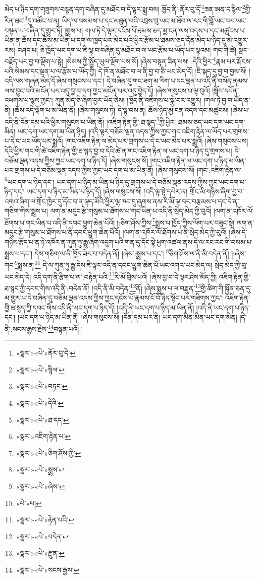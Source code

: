 མེད་པ་ཉིད་དག་གཟུགས་བརྙན་དག་བཞིན་དུ་མཐོང་བ་དེ་ལྟར་སྨྲ་བས། ཁྱོད་ནི་:ནོར་བུ་དོ་\footnote{«སྣར་»«པེ་»ནོར་བུ་དེ་}ཟན་ཨན་ད་རྙིལ་\footnote{«སྣར་»«པེ་»སྙིལ་}གྱི་རིན་ཐང་\footnote{«སྣར་»«པེ་»བཏང་}དུ་འཚོང་བ་ན། ཡིད་ལ་བསམས་པ་དང་མཐུན་པའི་འབྲས་བུ་ཡང་མ་ཐོབ་ལ་རང་གི་བློ་ཡང་བར་ཡང་བསྟན་པ་བཞིན་དུ་གྱུར་ཏོ། །སྨྲས་པ། གལ་ཏེ་དེ་ལྟར་དངོས་པོ་ཐམས་ཅད་མྱ་ངན་ལས་འདས་པ་དང་མཚུངས་པ་ཡིན་ན་ཆོས་དང་ཆོས་མ་ཡིན་པ་དག་ལ་ཁྱད་པར་མེད་པའི་ཕྱིར་རྩོམ་པ་ཐམས་ཅད་དོན་མེད་པ་ཉིད་དུ་མི་འགྱུར་རམ། བཤད་པ། ཅི་ཁྱོད་ཡང་དག་པ་ཇི་ལྟ་བ་བཞིན་དུ་མཐོང་བ་ལ་ཡང་རྩོམ་པ་ཡོད་པར་ལྟའམ། གང་གི་ཚེ། སྔར་བརྗོད་པར་བྱ་བ་ལྡོག་པ་སྟེ། །སེམས་ཀྱི་སྤྱོད་ཡུལ་ལྡོག་པས་སོ། །ཞེས་བསྟན་ཟིན་པས། :དེའི་ཕྱིར་\footnote{«སྣར་»«པེ་»དེའི་}རྣམ་པར་རྨོངས་པའི་སེམས་དང་ལྡན་པ་ལ་རྩོམ་པ་ཡོད་ཀྱི། དེ་ཁོ་ན་མཐོང་བ་ལ་ནི་བྱ་བ་ཅི་ཡང་མེད་དོ། །ཇི་སྐད་དུ་བྱ་བ་བྱས་སོ། །འདི་ལས་གཞན་མེད་དོ་ཞེས་གསུངས་པ་དང་། དེ་བཞིན་དུ་གང་ཟག་མ་རིག་པ་དང་ལྡན་པ་འདི་ནི་བསོད་ནམས་ལས་བྱུང་བའི་མངོན་པར་འདུ་བྱ་བ་དག་ཀྱང་མངོན་པར་འདུ་བྱེད་དོ། །ཞེས་གསུངས་པ་ལྟ་བུའོ། །སློབ་དཔོན་འཕགས་པ་ལྷས་ཀྱང་། ཀུན་མེད་ཅི་ཞིག་བྱར་ཡོད་ཅེས། །ཁྱོད་ནི་འཇིགས་པ་སྐྱེ་བར་འགྱུར། །གལ་ཏེ་བྱ་བ་ཡོད་ན་ནི། །ཆོས་འདི་ལྡོག་པ་མ་ཡིན་ནོ། །ཞེས་གསུངས་ཏེ། དེ་ལྟ་བས་ན། ཆོས་ཉིད་མྱ་ངན་འདས་དང་མཚུངས། །ཞེས་པ་འདི་ནི་དོན་དམ་པའི་ཕྱིར་གསུངས་པ་ཡིན་ནོ། །འཇིག་རྟེན་གྱི་:ཐ་སྙད་\footnote{«སྣར་»«པེ་»ཐ་དད་}ཀྱི་ཕྱིར། ཐམས་ཅད་ཡང་དག་ཡང་དག་མིན། ཡང་དག་ཡང་དག་མ་ཡིན་ཉིད། །འདི་ལྟར་བཅོམ་ལྡན་འདས་ཀྱིས་ཀྱང་གང་འཇིག་རྟེན་ལ་ཡོད་པར་གྲགས་པ་དེ་ང་ཡང་ཡོད་པར་སྨྲའོ། །གང་འཇིག་རྟེན་ལ་མེད་པར་གྲགས་པ་དེ་ང་ཡང་མེད་པར་སྨྲའོ། །ཞེས་གསུངས་པས། དེའི་ཕྱིར་གང་གི་ཚེ་འཇིག་རྟེན་གྱི་ཐ་སྙད་བྱ་བ་དེའི་ཚེ་ན་གང་འཇིག་རྟེན་ལ་ཡང་དག་པ་ཉིད་དུ་གྲགས་པ། དེ་བཅོམ་ལྡན་འདས་ཀྱིས་ཀྱང་ཡང་དག་པ་ཉིད་དོ། །ཞེས་གསུངས་སོ། །གང་འཇིག་རྟེན་ལ་ཡང་དག་པ་ཉིད་མ་ཡིན་པར་གྲགས་པ་དེ་བཅོམ་ལྡན་འདས་ཀྱིས་ཀྱང་ཡང་དག་པ་མ་ཡིན་ནོ། །ཞེས་གསུངས་སོ། །གང་:འཇིག་རྟེན་ལ་\footnote{«སྣར་»འཇིག་རྟེན་པ་}ཡང་དག་པ་ཉིད་དང་། ཡང་དག་པ་ཉིད་མ་ཡིན་པ་ཉིད་དུ་གྲགས་པ་དེ་བཅོམ་ལྡན་འདས་ཀྱིས་ཀྱང་ཡང་དག་པ་ཉིད་དང་། ཡང་དག་པ་ཉིད་མ་ཡིན་པ་ཉིད་དོ། །ཞེས་གསུངས་སོ། །འདི་ལྟ་སྟེ་དཔེར་ན། གྲོང་མི་གཉིས་ཞིག་བྱ་བ་འགའ་ཞིག་ལ་གྲོང་ཁྱེར་དུ་དོང་བ་ན་ལྟད་མོའི་ཕྱིར་ལྷ་ཁང་དུ་ཞུགས་ནས་རི་མོ་ལྟ་བར་བརྩམས་པ་དང་དེ་ན་གཅིག་གིས་སྨྲས་པ། ལག་ན་མདུང་རྩེ་གསུམ་པ་ཐོགས་པ་གང་ཡིན་པ་འདི་ནི་སྲེད་མེད་ཀྱི་བུའོ། །ལག་ན་འཁོར་ལོ་ཐོགས་པ་གང་ཡིན་པ་འདི་ནི་དབང་ཕྱུག་ཆེན་པོའོ། །:ཅིག་ཤོས་ཀྱིས་\footnote{«སྣར་»«པེ་»ཅིག་ཤོས་ཀྱི་}སྨྲས་པ་ཁྱོད་ཀྱིས་ལོག་པར་བཟུང་སྟེ། ལག་ན་མདུང་རྩེ་གསུམ་པ་ཐོགས་པ་ནི་དབང་ཕྱུག་ཆེན་པོའོ། །ལག་ན་འཁོར་ལོ་ཐོགས་པ་ནི་སྲེད་མེད་ཀྱི་བུའོ། །ཞེས་དེ་གཉིས་རྩོད་པ་ན་ཉེ་འཁོར་ན་ཀུན་ཏུ་རྒྱུ་ཞིག་འདུག་པའི་གན་དུ་དོང་སྟེ་ཕྱག་འཚལ་ནས་དེ་ལ་རང་རང་གི་བསམ་པ་སྨྲས་པ་དང་། དེས་གཅིག་ལ་ནི་ཁྱོད་ཟེར་བ་བདེན་ནོ། །ཞེས་:སྨྲས་པ་དང་། \footnote{«སྣར་»«པེ་»སྨྲས་}ཅིག་ཤོས་ལ་ནི་མི་བདེན་ནོ། །:ཞེས་གང་\footnote{«སྣར་»«པེ་»ཞེས་}སྨྲས་ན།\footnote{«པེ་»པ།} དེ་ལ་ཀུན་ཏུ་རྒྱུ་དེས་ཇི་ལྟར་འདི་ན་དབང་ཕྱུག་ཆེན་པོ་ཡང་འགའ་ཡང་མེད་ལ། སྲེད་མེད་ཀྱི་བུ་ཡང་མེད་དེ། འདི་དག་ནི་རྩིག་པ་ལ་:བརྟེན་པའི་\footnote{«སྣར་»«པེ་»རྟེན་པའི་}རི་མོ་བྲིས་པའོ། །ཞེས་བྱ་བ་དེ་ལྟར་ཤེས་མོད་ཀྱི། འཇིག་རྟེན་གྱི་ཐ་སྙད་ཀྱི་དབང་གིས་འདི་ནི་:བདེན་ནོ། །འདི་ནི་མི་བདེན་\footnote{«སྣར་»«པེ་»བདེན་}ནོ། །ཞེས་སྨྲས་པ་ལ་བརྫུན་\footnote{«སྣར་»«པེ་»རྫུན་}གྱི་ཚིག་གི་སྐྱོན་ཅན་དུ་མ་གྱུར་པ་དེ་བཞིན་དུ་བཅོམ་ལྡན་འདས་ཀྱིས་ཀྱང་དངོས་པོ་རྣམས་ངོ་བོ་ཉིད་སྟོང་པར་གཟིགས་ཀྱང་། འཇིག་རྟེན་གྱི་ཐ་སྙད་ཀྱི་དབང་གིས་འདི་ནི་ཡང་དག་པ་ཉིད་དོ། །འདི་ནི་ཡང་དག་པ་ཉིད་མ་ཡིན་ནོ། །འདི་ནི་ཡང་དག་པ་ཉིད་དང་། །ཡང་དག་པ་ཉིད་མ་ཡིན་ནོ། །ཞེས་གསུངས་སོ། །དོན་དམ་པར་ནི། ཡང་དག་མིན་མིན་ཡང་དག་མིན། །དེ་ནི་:སངས་རྒྱས་རྗེས་\footnote{«སྣར་»«པེ་»སངས་རྒྱས་}བསྟན་པའོ། །
